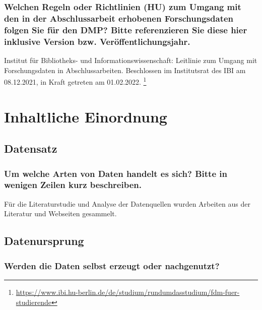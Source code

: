 \subsubsection{Welchen Regeln oder Richtlinien (HU) zum Umgang mit den in der Abschlussarbeit erhobenen Forschungsdaten folgen Sie für den DMP? Bitte referenzieren Sie diese hier inklusive Version bzw. Veröffentlichungsjahr.}

Institut für Bibliotheks- und Informationswissenschaft:
Leitlinie zum Umgang mit Forschungsdaten in Abschlussarbeiten.
Beschlossen im Institutsrat des IBI am 08.12.2021, in Kraft getreten am 01.02.2022.%
\footnote{\url{https://www.ibi.hu-berlin.de/de/studium/rundumdasstudium/fdm-fuer-studierende}}

\section{Inhaltliche Einordnung}


\subsection{Datensatz}

\subsubsection{Um welche Arten von Daten handelt es sich? Bitte in wenigen Zeilen kurz beschreiben.}

Für die Literaturstudie und Analyse der Datenquellen wurden Arbeiten aus der Literatur
und Webseiten gesammelt.

\subsection{Datenursprung}

\subsubsection{Werden die Daten selbst erzeugt oder nachgenutzt?}


